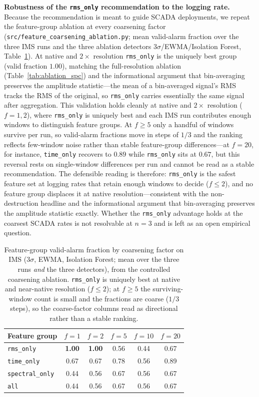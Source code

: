 \documentclass[journal]{IEEEtran}
\begin{document}
\textbf{Robustness of the \texttt{rms\_only} recommendation to the logging rate.}
Because the recommendation is meant to guide SCADA deployments, we repeat the
feature-group ablation at every coarsening factor
(\texttt{src/feature\_coarsening\_ablation.py}; mean valid-alarm fraction over the
three IMS runs and the three ablation detectors 3$\sigma$/EWMA/Isolation Forest,
Table~\ref{tab:coarsen}). At native and $2\times$ resolution \texttt{rms\_only} is the
uniquely best group (valid fraction $1.00$), matching the full-resolution ablation
(Table~\ref{tab:ablation_spc}) and the informational argument that bin-averaging
preserves the amplitude statistic---the mean of a bin-averaged signal's RMS tracks
the RMS of the original, so \texttt{rms\_only} carries essentially the same signal
after aggregation. This validation holds cleanly at native and $2\times$ resolution
($f{=}1, 2$), where \texttt{rms\_only} is uniquely best and each IMS run contributes
enough windows to distinguish feature groups. At $f\ge5$ only a handful of windows
survive per run, so valid-alarm fractions move in steps of $1/3$ and the ranking
reflects few-window noise rather than stable feature-group differences---at $f{=}20$,
for instance, \texttt{time\_only} recovers to $0.89$ while \texttt{rms\_only} sits at
$0.67$, but this reversal rests on single-window differences per run and cannot be read
as a stable recommendation. The defensible reading is therefore: \texttt{rms\_only} is
the safest feature set at logging rates that retain enough windows to decide
($f\le2$), and no feature group displaces it at native resolution---consistent with the
non-destruction headline and the informational argument that bin-averaging preserves
the amplitude statistic exactly. Whether the \texttt{rms\_only} advantage holds at the
coarsest SCADA rates is not resolvable at $n{=}3$ and is left as an open empirical
question.

\begin{table}[t]
\caption{Feature-group valid-alarm fraction by coarsening factor on IMS
(3$\sigma$, EWMA, Isolation Forest; mean over the three runs \emph{and} the three
detectors), from the controlled coarsening ablation. \texttt{rms\_only} is uniquely
best at native and near-native resolution ($f{\le}2$); at $f\ge5$ the surviving-window
count is small and the fractions are coarse ($1/3$ steps), so the coarse-factor
columns read as directional rather than a stable ranking.}
\label{tab:coarsen}
\centering
\footnotesize
\setlength{\tabcolsep}{6pt}
\begin{tabular}{@{}lccccc@{}}
\toprule
Feature group & $f{=}1$ & $f{=}2$ & $f{=}5$ & $f{=}10$ & $f{=}20$ \\
\midrule
\texttt{rms\_only}      & \textbf{1.00} & \textbf{1.00} & 0.56 & 0.44 & 0.67 \\
\texttt{time\_only}     & 0.67 & 0.67 & 0.78 & 0.56 & 0.89 \\
\texttt{spectral\_only} & 0.44 & 0.56 & 0.67 & 0.56 & 0.67 \\
\texttt{all}            & 0.44 & 0.56 & 0.67 & 0.56 & 0.67 \\
\bottomrule
\end{tabular}
\end{table}
\end{document}
